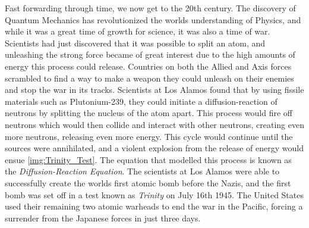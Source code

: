 \documentclass[letterpaper, 12pt]{article}
\begin{document}
         Fast forwarding through time, we now get to the 20th century. The discovery of Quantum Mechanics has revolutionized the worlds understanding of Physics, and while it was a great time of growth for science, it was also a time of war. Scientists had just discovered that it was possible to split an atom, and unleashing the strong force became of great interest due to the high amounts of energy this process could release. Countries on both the Allied and Axis forces scrambled to find a way to make a weapon they could unleash on their enemies and stop the war in its tracks. Scientists at Los Alamos found that by using fissile materials such as Plutonium-239, they could initiate a diffusion-reaction of neutrons by splitting the nucleus of the atom apart. This process would fire off neutrons which would then collide and interact with other neutrons, creating even more neutrons, releasing even more energy. This cycle would continue until the sources were annihilated, and a violent explosion from the release of energy would ensue \ref{img:Trinity_Test}. The equation that modelled this process is known as the \textit{Diffusion-Reaction Equation}. The scientists at Los Alamos were able to successfully create the worlds first atomic bomb before the Nazis, and the first bomb was set off in a test known as \textit{Trinity} on July 16th 1945. The United States used their remaining two atomic warheads to end the war in the Pacific, forcing a surrender from the Japanese forces in just three days.\\
\end{document}
